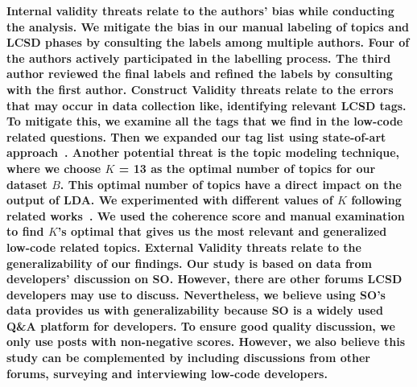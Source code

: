 
\bf{Internal validity} threats relate to the authors'
bias while conducting the analysis. We mitigate the bias in
our manual labeling of topics and  LCSD phases by consulting the labels among multiple authors. Four of the authors
actively participated in the labelling process. The third author reviewed the final labels and refined the labels by consulting with the first author. \bf{Construct Validity} threats 
relate to the errors that may occur in data collection like, identifying relevant LCSD tags. To mitigate this, we examine all the tags that we find in the low-code related questions. Then we expanded our tag list using state-of-art approach~\cite{bagherzadeh2019going,abdellatif2020challenges,ahmed2018concurrency, rosen2016mobile}. Another potential threat is the topic modeling technique, where we choose $K$ = 13 as the optimal number of topics for our dataset $B$. This optimal number of topics have a direct impact on the output of LDA. We experimented with different values of $K$ following related works~\cite{abdellatif2020challenges, bagherzadeh2019going}. We used the coherence score and manual examination to find $K$'s optimal that gives us the most relevant and generalized low-code related topics. \bf{External Validity} threats relate to the generalizability of our findings. Our study is based on data from developers' discussion on SO. However, there are other forums  LCSD developers may use to discuss. Nevertheless, we believe using SO's data provides us with generalizability because SO is a widely used Q\&A platform for developers. To ensure good quality discussion, we only use posts with non-negative scores. However, we also believe this study can be complemented by including discussions from other forums, surveying and interviewing low-code developers.

